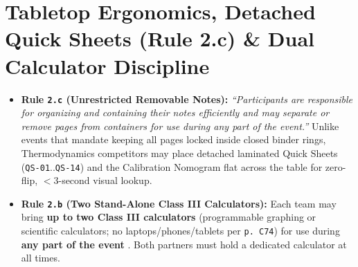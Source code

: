 \section{Tabletop Ergonomics, Detached Quick Sheets (Rule 2.c) \& Dual Calculator Discipline}\label{sec:21.3}

\begin{rulebox}
\begin{itemize}
  \item \textbf{Rule \texttt{2.c} (Unrestricted Removable Notes):} \textit{``Participants are responsible for organizing and containing their notes efficiently and may separate or remove pages from containers for use during any part of the event.''}  Unlike events that mandate keeping all pages locked inside closed binder rings, Thermodynamics competitors may place detached laminated Quick Sheets (\texttt{QS-01}..\texttt{QS-14}) and the  Calibration Nomogram flat across the table for zero-flip, $<3$-second visual lookup.
  \item \textbf{Rule \texttt{2.b} (Two Stand-Alone Class III Calculators):} Each team may bring \textbf{up to two Class III calculators} (programmable graphing or scientific calculators; no laptops/phones/tablets per \texttt{p.\ C74}) for use during \textbf{any part of the event} . Both partners must hold a dedicated calculator at all times.
\end{itemize}
\end{rulebox}

